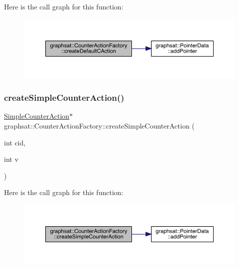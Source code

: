 Here is the call graph for this function\+:\nopagebreak
\begin{figure}[H]
\begin{center}
\leavevmode
\includegraphics[width=350pt]{classgraphsat_1_1_counter_action_factory_aec6aefcf28eaedeb5985cc31c8900b46_cgraph}
\end{center}
\end{figure}
\mbox{\label{classgraphsat_1_1_counter_action_factory_afbef0245be9501fe9ee39cd2538340c1}} 
\subsubsection{\texorpdfstring{createSimpleCounterAction()}{createSimpleCounterAction()}}
{\footnotesize\ttfamily \mbox{\hyperlink{classgraphsat_1_1_simple_counter_action}{Simple\+Counter\+Action}}$\ast$ graphsat\+::\+Counter\+Action\+Factory\+::create\+Simple\+Counter\+Action (\begin{DoxyParamCaption}\item[{int}]{cid,  }\item[{int}]{v }\end{DoxyParamCaption})\hspace{0.3cm}{\ttfamily [inline]}}

Here is the call graph for this function\+:\nopagebreak
\begin{figure}[H]
\begin{center}
\leavevmode
\includegraphics[width=350pt]{classgraphsat_1_1_counter_action_factory_afbef0245be9501fe9ee39cd2538340c1_cgraph}
\end{center}
\end{figure}
\mbox{\label{classgraphsat_1_1_counter_action_factory_a4bd75f27e6c64f7b2391504ccc506271}} 

